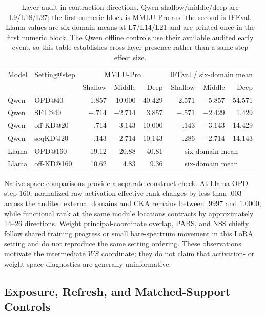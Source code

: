 \documentclass[letterpaper]{article} %
\begin{document}
\begin{table}[t]
\centering
\small
\setlength{\tabcolsep}{4pt}
\begin{tabular}{llrrrrrr}
\toprule
Model & Setting@step & \multicolumn{3}{c}{MMLU-Pro} &
\multicolumn{3}{c}{IFEval / six-domain mean} \\
& & Shallow & Middle & Deep & Shallow & Middle & Deep \\
\midrule
Qwen & OPD@40 & 1.857 & 10.000 & 40.429 & 2.571 & 5.857 & 54.571 \\
Qwen & SFT@40 & $-.714$ & $-2.714$ & 3.857 & $-.571$ & $-2.429$ & 1.429 \\
Qwen & off-KD@20 & .714 & $-3.143$ & 10.000 & $-.143$ & $-3.143$ & 14.429 \\
Qwen & seqKD@20 & .143 & $-2.714$ & 10.143 & $-.286$ & $-2.714$ & 14.143 \\
\midrule
Llama & OPD@160 & 19.12 & 20.88 & 40.81 & \multicolumn{3}{c}{six-domain mean} \\
Llama & off-KD@160 & 10.62 & 4.83 & 9.36 & \multicolumn{3}{c}{six-domain mean} \\
\bottomrule
\end{tabular}
\caption{Layer audit in contraction directions. Qwen shallow/middle/deep are L9/L18/L27;
the first numeric block is MMLU-Pro and the second is IFEval. Llama values are
six-domain means at L7/L14/L21 and are printed once in the first numeric block. The
Qwen offline controls use their available audited early event, so this table establishes
cross-layer presence rather than a same-step effect size.}
\label{tab:supp-layers}
\end{table}

Native-space comparisons provide a separate construct check. At Llama OPD step 160,
normalized raw-activation effective rank changes by less than $.003$ across the audited
external domains and CKA remains between $.9997$ and $1.0000$, while functional rank at
the same module locations contracts by approximately 14--26 directions. Weight
principal-coordinate overlap, PABS, and NSS chiefly follow shared training progress or
small bare-spectrum movement in this LoRA setting and do not reproduce the same setting
ordering. These observations motivate the intermediate $WS$ coordinate; they do not
claim that activation- or weight-space diagnostics are generally uninformative.

\subsection{Exposure, Refresh, and Matched-Support Controls}
\end{document}
